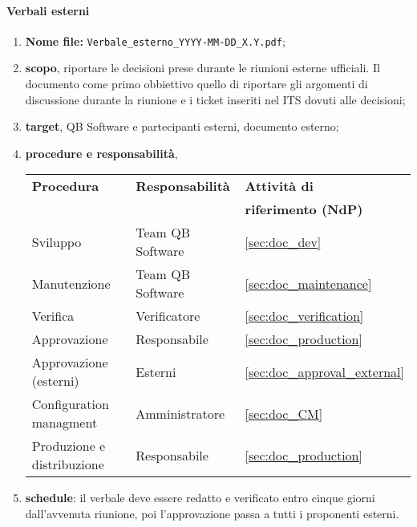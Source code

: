         \paragraph{Verbali esterni}
            \begin{enumerate}
                \item \textbf{Nome file:} \texttt{Verbale\_esterno\_YYYY-MM-DD\_X.Y.pdf};
                \item \textbf{scopo}, riportare le decisioni prese durante le riunioni esterne ufficiali. Il documento come primo obbiettivo quello di riportare gli argomenti di discussione durante la riunione e i ticket inseriti nel ITS dovuti alle decisioni;
                \item \textbf{target}, QB Software e partecipanti esterni, documento esterno;
                \item \textbf{procedure e responsabilità},
                \\
                \begin{tabularx}{0.93\textwidth}{|X|X|X|}
                    \hline
                    \textbf{Procedura} & \textbf{Responsabilità} & \textbf{Attività di} \\
                    & & \textbf{riferimento (NdP)} \\
                    \hline
                    Sviluppo & Team QB Software &  \ref{sec:doc_dev}
                    \\\hline
                    Manutenzione & Team QB Software & \ref{sec:doc_maintenance}
                    \\\hline
                    Verifica & Verificatore & \ref{sec:doc_verification}
                    \\\hline
                    Approvazione & Responsabile & \ref{sec:doc_production}
                    \\\hline
                    Approvazione (esterni) & Esterni & \ref{sec:doc_approval_external}
                    \\\hline
                    Configuration managment & Amministratore & \ref{sec:doc_CM}
                    \\\hline
                    Produzione e distribuzione & Responsabile & \ref{sec:doc_production}
                    \\\hline
                \end{tabularx}
                \item \textbf{schedule}: il verbale deve essere redatto e verificato entro cinque giorni dall'avvenuta riunione, poi l'approvazione passa a tutti i proponenti esterni.
            \end{enumerate} 

